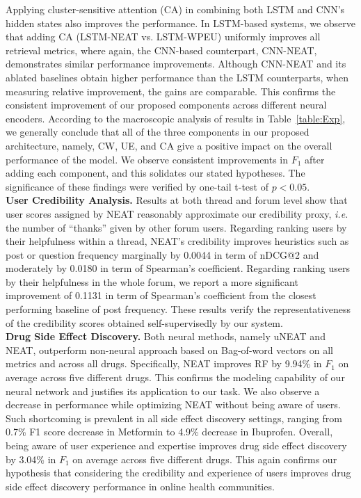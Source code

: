 \documentclass{bmcart}
\begin{document}
Applying cluster-sensitive attention (CA) in combining both LSTM and CNN's
hidden states also improves the performance. In LSTM-based systems, we observe 
that adding CA (LSTM-NEAT vs. LSTM-WPEU) uniformly improves all retrieval metrics, where again, the CNN-based counterpart,
CNN-NEAT, demonstrates similar performance improvements. Although CNN-NEAT and its ablated baselines obtain higher performance than the LSTM counterparts, when measuring relative improvement, the gains are comparable. This confirms the consistent improvement of our proposed components across different neural encoders. According to the macroscopic analysis of results in
Table~\ref{table:Exp}, we generally conclude that all of the three components in our proposed architecture, namely, CW, UE, and
CA give a positive impact on the overall performance of the
model. We observe consistent improvements in $F_1$ after adding each component, and this solidates our stated hypotheses. The significance of these findings were verified by one-tail t-test of $p < 0.05$. \\

{\bf User Credibility Analysis.}
Results at both thread and forum level show that user scores assigned by NEAT reasonably approximate our credibility proxy, \textit{i.e.} the number of ``thanks'' given by other forum users. Regarding ranking users by their helpfulness within a thread, NEAT's credibility improves heuristics such as post or question frequency marginally by 0.0044 in term of nDCG@2 and moderately by 0.0180 in term of Spearman's coefficient. Regarding ranking users by their helpfulness in the whole forum, we report a more significant improvement of 0.1131 in term of Spearman's coefficient from the closest performing baseline of post frequency. These results verify the representativeness of the credibility scores obtained self-supervisedly by our system. \\

{\bf Drug Side Effect Discovery.}
Both neural methods, namely uNEAT and NEAT, outperform non-neural approach based on Bag-of-word vectors on all metrics and across all drugs. Specifically, NEAT improves RF by 9.94\% in $F_1$ on average across five different drugs. This confirms the modeling capability of our neural network and justifies its application to our task. We also observe a decrease in performance while optimizing 
NEAT without being aware of users. Such shortcoming is prevalent in all side effect discovery settings, ranging from 0.7\% F1 score decrease in Metformin to 4.9\% decrease in Ibuprofen. Overall, being aware of user experience and expertise improves drug side effect discovery by 3.04\% in $F_1$ on average across five different drugs. This again confirms our hypothesis that considering the credibility and experience of users improves drug side effect discovery performance in online health communities. \\
\end{document}
